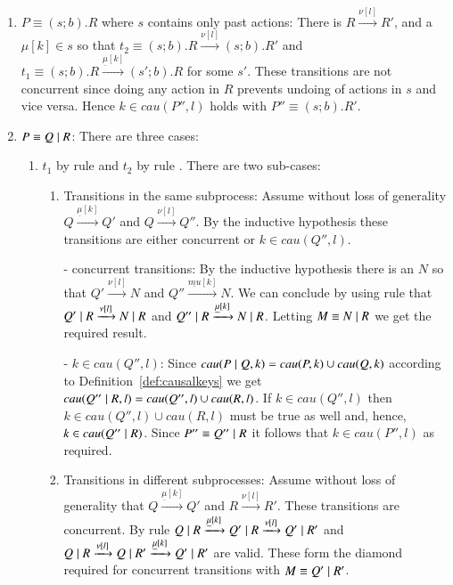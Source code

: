 \begin{subappendices}
\begin{pf}
\begin{enumerate}
\begin{enumerate}
\item $P\equiv (s;b).R$ where $s$ contains only past actions: There is
$R \xrightarrow{\nu[l]} R'$, and a $\mu[k] \in s$ so that 
$t_2 \equiv (s;b).R \xrightarrow{\nu[l]} (s;b).R'$ and $t_1 \equiv (s;b).R 
\xrightarrow{\underline{\mu}[k]} (s';b).R$ for some $s'$. These transitions are not concurrent 
since doing any action in $R$ prevents undoing of actions in $s$ and vice versa. 
Hence $k \in cau(P'',l)$ holds with $P'' \equiv (s;b).R'$.
\item $P\equiv Q \; \vert \; R$:
There are three cases:
\begin{enumerate}
	\item $t_1$ by rule  and $t_2$ by rule . There are two sub-cases:
\begin{enumerate}
\item Transitions in the same subprocess: Assume without loss of generality $Q \xrightarrow{\underline{\mu}[k]} Q'$ and $Q \xrightarrow{\nu[l]} Q''$. By the inductive hypothesis these transitions are either concurrent or $k \in cau(Q'',l)$.

	- concurrent transitions: By the inductive hypothesis there is an $N$ so that $Q' \xrightarrow{\nu[l]} N$ and $Q'' \xrightarrow{\underline{mu}[k]} N$. We can conclude by using rule  that $Q' \; \vert \; R \xrightarrow{\nu[l]} N \; \vert \; R$ and $Q'' \; \vert \; R \xrightarrow{\underline{\mu}[k]} N \; \vert \; R$. Letting
$M \equiv N \; \vert \; R$ we get the required result.

- $k \in cau(Q'',l)$: Since $cau(P \; \vert \; Q,k) = cau(P,k) \cup cau(Q,k)$ according to Definition~\ref{def:causalkeys} we get $cau(Q'' \; \vert \; R,l)=cau(Q'',l) \cup cau(R,l)$. If $k \in cau(Q'',l)$ then $k \in cau(Q'',l) \cup cau(R,l)$ must be true as well and, hence, $k \in cau(Q'' \; \vert \; R)$. Since $P''\equiv Q'' \; \vert \; R$ it follows that $k \in cau(P'',l)$ as required.

\item Transitions in different subprocesses: Assume without loss of generality that $Q \xrightarrow{\underline{\mu}[k]} Q'$ and $R \xrightarrow{\nu[l]} R'$. These transitions are concurrent. 
By rule  $Q \; \vert \; R \xrightarrow{\underline{\mu}[k]} Q' \; \vert \; R \xrightarrow{\nu[l]} Q' \; \vert \; R'$ and $Q \; \vert \; R \xrightarrow{\nu[l]} Q \; \vert \; R' \xrightarrow{\underline{\mu}[k]} Q' \; \vert \; R'$ are valid. These form the diamond required for concurrent transitions with $M \equiv Q' \; \vert \; R'$.


\end{enumerate}
\end{enumerate}
\end{enumerate}
\end{enumerate}
\end{pf}
\end{subappendices}
